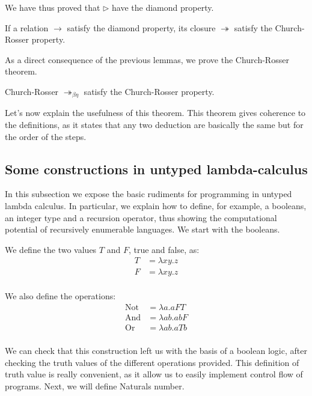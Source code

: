\begin{remark}
  We have thus proved that $\triangleright$ have the diamond property.
\end{remark}

\begin{remark}
  If a relation $\to$ satisfy the diamond property, its closure $\twoheadrightarrow$ satisfy the Church-Rosser property.
\end{remark}


As a direct consequence of the previous lemmas, we prove the Church-Rosser theorem.
\begin{theorem}{Church-Rosser}
  $\twoheadrightarrow_{\beta\eta}$ satisfy the Church-Rosser property.
\end{theorem}


Let's now explain the usefulness of this theorem. This theorem gives coherence to the definitions, as it states that any two deduction are basically the same but for the order of the steps. 

\subsection{Some constructions in untyped lambda-calculus}
In this subsection we expose the basic rudiments for programming in untyped lambda calculus. In particular, we explain how to define, for example, a booleans, an integer type and a recursion operator, thus showing the computational potential of recursively enumerable languages. We start with the booleans.

\begin{definition} \label{def:untyped-natural} 
  We define the two values $T$ and $F$, true and false, as:
  \begin{align*}
    T &= \lambda xy.z\\
    F &= \lambda xy.z\\
  \end{align*}

  We also define the operations:
  \begin{align*}
    \operatorname{Not} &= \lambda a.aFT\\
    \operatorname{And} &= \lambda ab.abF\\
    \operatorname{Or} &= \lambda ab.aTb\\
  \end{align*}
\end{definition}

We can check that this construction left us with the basis of a boolean logic, after checking the truth values of the different operations provided. This definition of truth value is really convenient, as it allow us to easily implement control flow of programs. Next, we will define Naturals number. 

